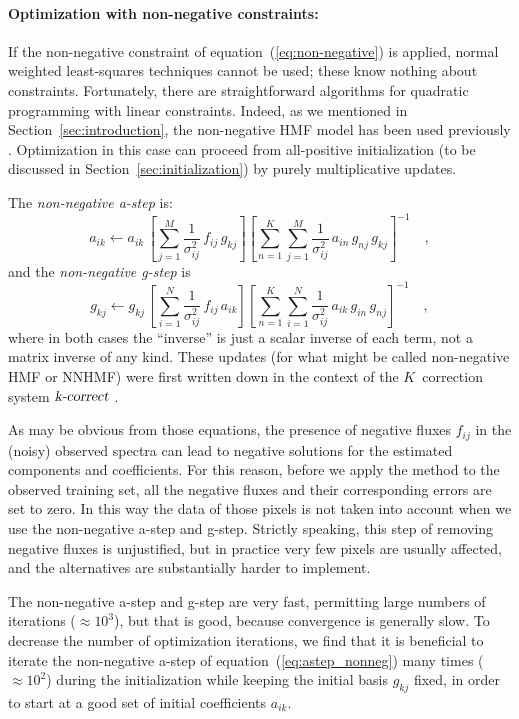 \documentclass[12pt,preprint]{aastex}
\newcommand{\sectionname}{Section}
\newcommand{\equationname}{equation}
\begin{document}
\paragraph{Optimization with non-negative constraints:}
If the non-negative constraint of
\equationname~(\ref{eq:non-negative}) is applied, normal weighted
least-squares techniques cannot be used; these know nothing about
constraints.  Fortunately, there are straightforward algorithms for
quadratic programming with linear constraints.  Indeed, as we
mentioned in \sectionname~\ref{sec:introduction}, the non-negative HMF
model has been used previously \citep{blanton}.  Optimization in this
case can proceed from all-positive initialization (to be discussed in
\sectionname~\ref{sec:initialization}) by purely multiplicative
updates.

The \emph{non-negative a-step} is:
\begin{equation}\label{eq:astep_nonneg}
a_{ik} \gets a_{ik}\,\left[\sum_{j=1}^{M}\frac{1}{\sigma^2_{ij}}\,f_{ij}\,g_{kj}\right]\left[\sum_{n=1}^{K}\sum_{j=1}^{M}\frac{1}{\sigma^2_{ij}}\,a_{in}\,g_{nj}\,g_{kj}\right]^{-1}
\quad ,
\end{equation}
and the \emph{non-negative g-step} is
\begin{equation}\label{eq:gstep_nonneg}
g_{kj} \gets g_{kj}\,\left[\sum_{i=1}^{N}\frac{1}{\sigma^2_{ij}}\,f_{ij}\,a_{ik}\right]\left[\sum_{n=1}^{K}\sum_{i=1}^{N}\frac{1}{\sigma^2_{ij}}\,a_{ik}\,g_{in}\,g_{nj}\right]^{-1}
\quad ,
\end{equation}
where in both cases the ``inverse'' is just a scalar inverse of each
term, not a matrix inverse of any kind.  These updates (for what might
be called non-negative HMF or NNHMF) were first written down in the
context of the $K$~correction system $\textsl{k-correct}$
\citep{blanton}.

As may be obvious from those equations, the presence of negative
fluxes $f_{ij}$ in the (noisy) observed spectra can lead to negative
solutions for the estimated components and coefficients. For this
reason, before we apply the method to the observed training set, all
the negative fluxes and their corresponding errors are set to zero. In
this way the data of those pixels is not taken into account when we
use the non-negative a-step and g-step.  Strictly speaking, this step
of removing negative fluxes is unjustified, but in practice very few
pixels are usually affected, and the alternatives are substantially
harder to implement.

The non-negative a-step and g-step are very fast, permitting large
numbers of iterations ($\approx 10^3$), but that is good, because
convergence is generally slow.  To decrease the number of optimization
iterations, we find that it is beneficial to iterate the non-negative
a-step of \equationname~(\ref{eq:astep_nonneg}) many times ($\approx
10^2$) during the initialization while keeping the initial basis
$g_{kj}$ fixed, in order to start at a good set of initial
coefficients $a_{ik}$.
\end{document}
